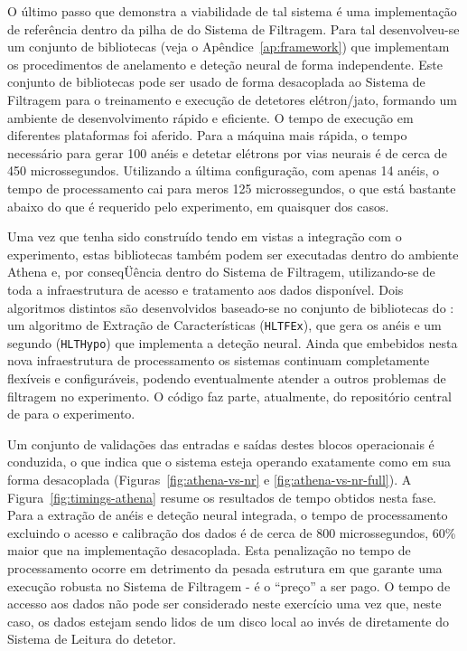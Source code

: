 O último passo que demonstra a viabilidade de tal sistema é uma implementação
de referência dentro da pilha de  do Sistema de Filtragem. Para
tal desenvolveu-se um conjunto de bibliotecas (veja o
Apêndice~\ref{ap:framework}) que implementam os procedimentos de anelamento e
deteção neural de forma independente. Este conjunto de bibliotecas pode ser
usado de forma desacoplada ao Sistema de Filtragem para o treinamento e
execução de detetores elétron/jato, formando um ambiente de desenvolvimento
rápido e eficiente. O tempo de execução em diferentes plataformas foi
aferido. Para a máquina mais rápida, o tempo necessário para gerar 100 anéis e
detetar elétrons por vias neurais é de cerca de 450 microssegundos. Utilizando
a última configuração, com apenas 14 anéis, o tempo de processamento cai para
meros 125 microssegundos, o que está bastante abaixo do que é requerido pelo
experimento, em quaisquer dos casos.

Uma vez que tenha sido construído tendo em vistas a integração com o
experimento, estas bibliotecas também podem ser executadas dentro do ambiente
Athena e, por conseqÜência dentro do Sistema de Filtragem, utilizando-se de
toda a infraestrutura de acesso e tratamento aos dados disponível. Dois
algoritmos distintos são desenvolvidos baseado-se no conjunto de bibliotecas
do : um algoritmo de Extração de Características
(\texttt{HLTFEx}), que gera os anéis e um segundo (\texttt{HLTHypo}) que
implementa a deteção neural. Ainda que embebidos nesta nova infraestrutura de
processamento os sistemas continuam completamente flexíveis e configuráveis,
podendo eventualmente atender a outros problemas de filtragem no
experimento. O código faz parte, atualmente, do repositório central de
 para o experimento.

Um conjunto de validações das entradas e saídas destes blocos operacionais é
conduzida, o que indica que o sistema esteja operando exatamente como em sua
forma desacoplada (Figuras~\ref{fig:athena-vs-nr} e
\ref{fig:athena-vs-nr-full}). A Figura~\ref{fig:timings-athena} resume os
resultados de tempo obtidos nesta fase. Para a extração de anéis e deteção
neural integrada, o tempo de processamento excluindo o acesso e calibração dos
dados é de cerca de 800 microssegundos, 60\% maior que na implementação
desacoplada. Esta penalização no tempo de processamento ocorre em detrimento
da pesada estrutura em  que garante uma execução robusta no
Sistema de Filtragem - é o ``preço'' a ser pago. O tempo de accesso aos dados
não pode ser considerado neste exercício uma vez que, neste caso, os dados
estejam sendo lidos de um disco local ao invés de diretamente do Sistema de
Leitura do detetor.


